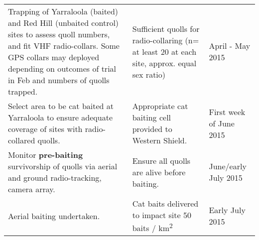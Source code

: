 \documentclass[version=last,
    paper=a4,                               %
    10pt,                                   %
    dvipsnames,
    oneside,                              %
    headings=openany,                       %
    open=any,
    BCOR=7mm,                               %
    DIV=15,     %
]{scrbook}
\begin{document}
\begin{longtable}[]{@{}lll@{}}
\begin{minipage}[t]{0.30\columnwidth}
Trapping of Yarraloola (baited) and Red Hill (unbaited control) sites to
assess quoll numbers, and fit VHF radio-collars. Some GPS collars may
deployed depending on outcomes of trial in Feb and numbers of quolls
trapped.\strut
\end{minipage} & \begin{minipage}[t]{0.30\columnwidth}\raggedright
Sufficient quolls for radio-collaring (n= at least 20 at each site,
approx. equal sex ratio)\strut
\end{minipage} & \begin{minipage}[t]{0.30\columnwidth}\raggedright
April - May 2015\strut
\end{minipage}\tabularnewline
\begin{minipage}[t]{0.30\columnwidth}\raggedright
Select area to be cat baited at Yarraloola to ensure adequate coverage
of sites with radio-collared quolls.\strut
\end{minipage} & \begin{minipage}[t]{0.30\columnwidth}\raggedright
Appropriate cat baiting cell provided to Western Shield.\strut
\end{minipage} & \begin{minipage}[t]{0.30\columnwidth}\raggedright
First week of June 2015\strut
\end{minipage}\tabularnewline
\begin{minipage}[t]{0.30\columnwidth}\raggedright
Monitor \textbf{pre-baiting} survivorship of quolls via aerial and
ground radio-tracking, camera array.~~~~~\strut
\end{minipage} & \begin{minipage}[t]{0.30\columnwidth}\raggedright
Ensure all quolls are alive before baiting.\strut
\end{minipage} & \begin{minipage}[t]{0.30\columnwidth}\raggedright
June/early July 2015\strut
\end{minipage}\tabularnewline
\begin{minipage}[t]{0.30\columnwidth}\raggedright
Aerial baiting undertaken.\strut
\end{minipage} & \begin{minipage}[t]{0.30\columnwidth}\raggedright
Cat baits delivered to impact site 50 baits /
km\textsuperscript{2}\strut
\end{minipage} & \begin{minipage}[t]{0.30\columnwidth}\raggedright
Early July 2015\strut
\end{minipage}\tabularnewline

\end{longtable}
\end{document}
